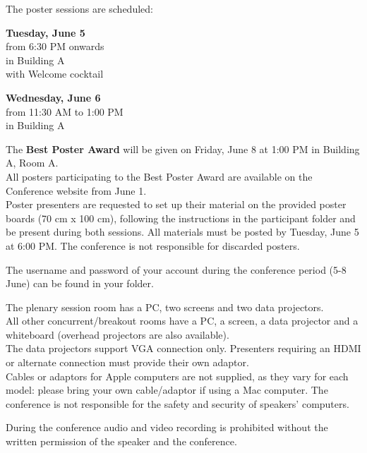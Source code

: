 
The poster sessions are scheduled:
\begin{center}
  \textbf{Tuesday, June 5} \\
  from 6:30 PM onwards \\
  in Building A\\
  with Welcome cocktail

  \bigskip
   
  \textbf{Wednesday, June 6} \\
  from 11:30 AM to 1:00 PM \\
  in Building A
\end{center}

\noindent The \textbf{Best Poster Award} will be given on Friday, June 8 at 1:00 PM in Building A, Room A.\\

\noindent All posters participating to the Best Poster Award are available on the Conference website from June 1.\\
Poster presenters are requested to set up
their material on the provided poster boards (70 cm x 100 cm), following the instructions in the participant folder and be present during both sessions.  
All materials must be posted by Tuesday, June 5 at 6:00 PM.
The conference is not responsible for discarded posters.

The username and password of your account during the conference period (5-8 June) can be found in your folder.

The plenary session room has a PC, two screens and two data projectors.\\ 
All other concurrent/breakout rooms have a PC, a screen, a data projector and a whiteboard (overhead projectors are also available).\\
The data projectors support VGA connection only. Presenters requiring an HDMI or alternate connection must provide their own adaptor.\\
Cables or adaptors for Apple computers are not supplied, as they vary for each model: please bring your own cable/adaptor if using a Mac computer. 
The conference is not responsible for the safety and security of speakers' computers.

During the conference audio and video recording is prohibited without the written permission of the speaker and the conference.

